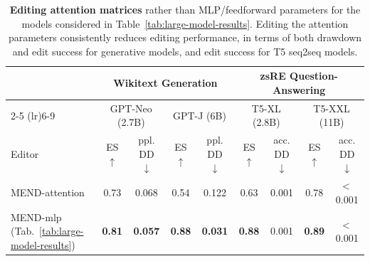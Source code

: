 \documentclass{article}
\newcommand{\name}{MEND}
\newcommand{\rebuttal}[1]{#1}
\newcommand{\textlt}[1]{\textless\,#1\phantom{\textless\,}}
\begin{document}
\begin{appendix}
\begin{table}
    \centering
    \small
    \begin{tabular}{lcccccccc}
    \toprule
       & \multicolumn{4}{c}{\textbf{Wikitext Generation}} & \multicolumn{4}{c}{\textbf{zsRE Question-Answering}} \\ 
       \cmidrule(lr){2-5} \cmidrule(lr){6-9}
       & \multicolumn{2}{c}{GPT-Neo (2.7B)} & \multicolumn{2}{c}{GPT-J (6B)} & \multicolumn{2}{c}{T5-XL (2.8B)} & \multicolumn{2}{c}{T5-XXL (11B)} \\
       \midrule
       Editor & ES $\uparrow$ & ppl. DD $\downarrow$ & ES $\uparrow$ & ppl. DD $\downarrow$ & ES $\uparrow$ & acc. DD $\downarrow$ & ES $\uparrow$ & acc. DD $\downarrow$ \\
       \midrule
       \name-attention & 0.73 & 0.068 & 0.54 & 0.122 & 0.63 & 0.001 & 0.78 & \textlt{0.001} \\
       \name-mlp (Tab.~\ref{tab:large-model-results}) & \textbf{0.81} & \textbf{0.057} & \textbf{0.88} & \textbf{0.031} & \textbf{0.88} & 0.001 & \textbf{0.89} & \textlt{0.001} \\
     \bottomrule
    \end{tabular}
    \caption{\rebuttal{\textbf{Editing attention matrices} rather than MLP/feedforward parameters for the models considered in Table~\ref{tab:large-model-results}. Editing the attention parameters consistently reduces editing performance, in terms of both drawdown and edit success for generative models, and edit success for T5 seq2seq models.}}
    \label{tab:large-model-attention}
\end{table}



\end{appendix}
\end{document}
